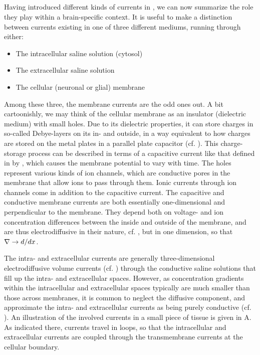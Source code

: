 \subsection{}
\label{sec:Basics:braincurrents}
Having introduced different kinds of currents in , we can now summarize the role they play within a brain-specific context. It is useful to make a distinction between currents existing in one of three different mediums, running through either:
\begin{itemize}
\item The intracellular saline solution (cytosol)
\item The extracellular saline solution
\item The cellular (neuronal or glial) membrane
\end{itemize}

Among these three, the membrane currents are the odd ones out. A bit cartoonishly, we may think of the cellular membrane as an insulator (dielectric medium) with small holes.
 Due to its dielectric properties, it can store charges in so-called Debye-layers on its in- and outside, in a way equivalent to how charges are stored on the metal plates in a parallel plate capacitor (cf. ).  This charge-storage process can be described in terms of a capacitive current like that defined in by , which causes the membrane potential to vary with time. The holes represent various kinds of ion channels, which are conductive pores in the membrane that allow ions to pass through them. Ionic currents through ion channels come in addition to the capacitive current. The capacitive and conductive membrane currents are both essentially one-dimensional and perpendicular to the membrane. They depend both on voltage- and ion concentration differences between the inside and outside of the membrane, and are thus electrodiffusive in their nature, cf. , but in one dimension, so that ${\bf \nabla} \rightarrow d/dx$.

The intra- and extracellular currents are generally three-dimensional electrodiffusive volume currents (cf. ) through the conductive saline solutions that fill up the intra- and extracellular spaces. However, as concentration gradients within the intracellular and extracellular spaces typically are much smaller than those across membranes, it is common to neglect the diffusive component, and approximate the intra- and extracellular currents as being purely conductive (cf. ). An illustration of the involved currents in a small piece of tissue is given in A. As indicated there, currents travel in loops, so that the intracellular and extracellular currents are coupled through the transmembrane currents at the cellular boundary. 

